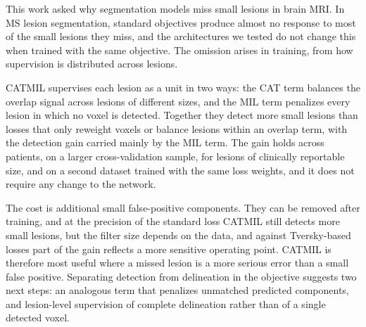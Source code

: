 This work asked why segmentation models miss small lesions in brain MRI.
In MS lesion segmentation, standard objectives produce almost no response
to most of the small lesions they miss, and the architectures we tested do
not change this when trained with the same objective. The omission arises
in training, from how supervision is distributed across lesions.

CATMIL supervises each lesion as a unit in two ways: the CAT term balances
the overlap signal across lesions of different sizes, and the MIL term
penalizes every lesion in which no voxel is detected. Together they detect
more small lesions than losses that only reweight voxels or balance
lesions within an overlap term, with the detection gain carried mainly by
the MIL term. The gain holds
across patients, on a larger cross-validation sample, for lesions of
clinically reportable size, and on a second dataset trained with the same
loss weights, and it does not require any change to the network.

The cost is additional small false-positive components. They can be
removed after training, and at the precision of the standard loss CATMIL
still detects more small lesions, but the filter size depends on the data,
and against Tversky-based losses part of the gain reflects a more
sensitive operating point. CATMIL is therefore most useful where a missed
lesion is a more serious error than a small false positive. Separating
detection from delineation in the objective suggests two next steps: an
analogous term that penalizes unmatched predicted components, and
lesion-level supervision of complete delineation rather than of a single
detected voxel.
